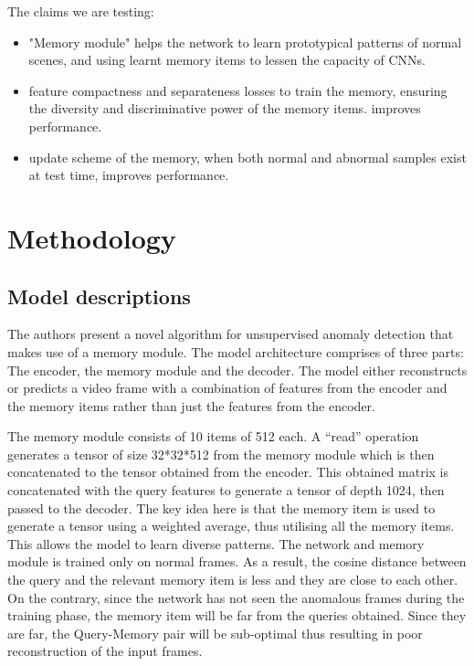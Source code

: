 The claims we are testing:
\begin{itemize}
    \item "Memory module" helps the network to learn prototypical patterns of normal scenes, and using learnt memory items to lessen the capacity of CNNs.
    \item feature compactness and separateness losses to train the memory, ensuring the diversity and discriminative power of the memory items.  improves performance.
    \item update scheme of the memory, when both normal and abnormal samples exist at test time, improves performance.
\end{itemize}


\section{Methodology}

\subsection{Model descriptions}
The authors present a novel algorithm for unsupervised anomaly detection that makes use of a memory module.
The model architecture comprises of three parts: 
The encoder, the memory module and the decoder. 
The model either reconstructs or predicts a video frame with a combination of features from the encoder and the memory items rather than just the features from the encoder. 

The memory module consists of 10 items of 512 each. A “read” operation generates a tensor of size 32*32*512 from the memory module which is then concatenated to the tensor obtained from the encoder. This obtained matrix is concatenated with the query features to generate a tensor of depth 1024, then passed to the decoder. The key idea here is that the memory item is used to generate a tensor using a weighted average, thus utilising all the memory items. This allows the model to learn diverse patterns. The network and memory module is trained only on normal frames. As a result, the cosine distance between the query and the relevant memory item is less and they are close to each other. On the contrary, since the network has not seen the anomalous frames during the training phase, the memory item will be far from the queries obtained. Since they are far, the Query-Memory pair will be sub-optimal thus resulting in poor reconstruction of the input frames. 

